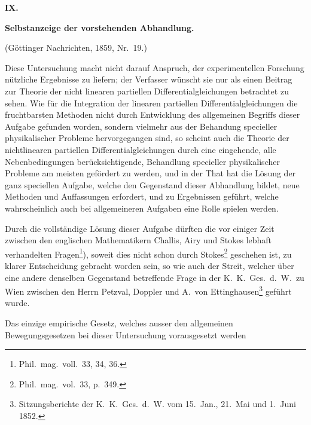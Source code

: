 \documentclass[12pt,a4paper]{book}
\theoremstyle{definition}
\theoremstyle{remark}
\begin{document}
\newpage
\begin{center}
\Large\textbf{IX.}
\end{center}
\vspace{-0.5em}
\begin{center}
\Large\textbf{Selbstanzeige der vorstehenden Abhandlung.}
\end{center}
\vspace{0.3em}
\begin{center}
\small (G\"ottinger Nachrichten, 1859, Nr.~19.)
\end{center}

\bigskip

Diese Untersuchung macht nicht darauf Anspruch, der experimentellen Forschung n\"utzliche Ergebnisse zu liefern; der Verfasser w\"unscht sie nur als einen Beitrag zur Theorie der nicht linearen partiellen Differentialgleichungen betrachtet zu sehen. Wie f\"ur die Integration der linearen partiellen Differentialgleichungen die fruchtbarsten Methoden nicht durch Entwicklung des allgemeinen Begriffs dieser Aufgabe gefunden worden, sondern vielmehr aus der Behandung specieller physikalischer Probleme hervorgegangen sind, so scheint auch die Theorie der nichtlinearen partiellen Differentialgleichungen durch eine eingehende, alle Nebenbedingungen ber\"ucksichtigende, Behandlung specieller physikalischer Probleme am meisten gef\"ordert zu werden, und in der That hat die L\"osung der ganz speciellen Aufgabe, welche den Gegenstand dieser Abhandlung bildet, neue Methoden und Auffassungen erfordert, und zu Ergebnissen gef\"uhrt, welche wahrscheinlich auch bei allgemeineren Aufgaben eine Rolle spielen werden.

Durch die vollst\"andige L\"osung dieser Aufgabe d\"urften die vor einiger Zeit zwischen den englischen Mathematikern Challis, Airy und Stokes lebhaft verhandelten Fragen\footnote{Phil.~mag.~voll.~33, 34, 36.}), soweit dies nicht schon durch Stokes\footnote{Phil.~mag.~vol.~33, p.~349.} geschehen ist, zu klarer Entscheidung gebracht worden sein, so wie auch der Streit, welcher \"uber eine andere denselben Gegenstand betreffende Frage in der K.~K.~Ges.~d.~W.~zu Wien zwischen den Herrn Petzval, Doppler und A.~von Ettinghausen\footnote{Sitzungsberichte der K.~K.~Ges.~d.~W. vom 15.~Jan., 21.~Mai und 1.~Juni 1852.} gef\"uhrt wurde.

Das einzige empirische Gesetz, welches ausser den allgemeinen Bewegungsgesetzen bei dieser Untersuchung vorausgesetzt werden
\end{document}
